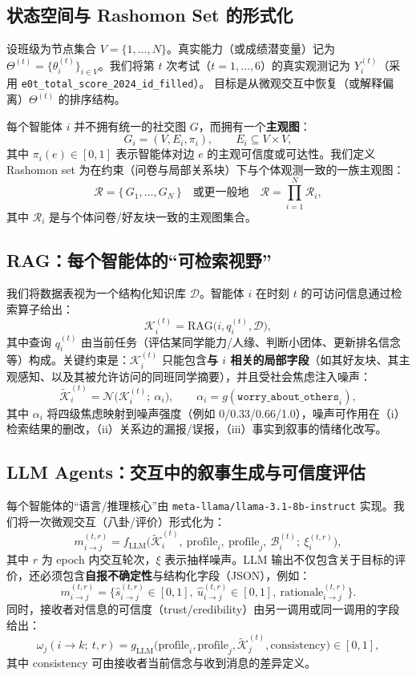 \documentclass[UTF8, a4paper, 11pt]{ctexart}
\begin{document}
\subsection{状态空间与 Rashomon Set 的形式化}
设班级为节点集合 \(V=\{1,\dots,N\}\)。真实能力（或成绩潜变量）记为 \(\Theta^{(t)}=\{\theta_i^{(t)}\}_{i\in V}\)。我们将第 \(t\) 次考试（\(t=1,\dots,6\)）的真实观测记为 \(Y_i^{(t)}\)（采用 \texttt{e0t\_total\_score\_2024\_id\_filled}）。
目标是从微观交互中恢复（或解释偏离）\(\Theta^{(t)}\) 的排序结构。

每个智能体 \(i\) 并不拥有统一的社交图 \(G\)，而拥有一个\textbf{主观图}：
\[
G_i = (V, E_i, \pi_i),\qquad E_i \subseteq V\times V,
\]
其中 \(\pi_i(e)\in[0,1]\) 表示智能体对边 \(e\) 的主观可信度或可达性。我们定义 Rashomon set 为在约束（问卷与局部关系块）下与个体观测一致的一族主观图：
\[
\mathcal{R} = \{\, G_1,\dots,G_N \,\}\quad\text{或更一般地}\quad
\mathcal{R}=\prod_{i=1}^N \mathcal{R}_i,
\]
其中 \(\mathcal{R}_i\) 是与个体问卷/好友块一致的主观图集合。

\subsection{RAG：每个智能体的“可检索视野”}
我们将数据表视为一个结构化知识库 \(\mathcal{D}\)。智能体 \(i\) 在时刻 \(t\) 的可访问信息通过检索算子给出：
\[
\mathcal{K}_i^{(t)} = \text{RAG}\big(i, q_i^{(t)}, \mathcal{D}\big),
\]
其中查询 \(q_i^{(t)}\) 由当前任务（评估某同学能力/人缘、判断小团体、更新排名信念等）构成。关键约束是：\(\mathcal{K}_i^{(t)}\) 只能包含\textbf{与 \(i\) 相关的局部字段}（如其好友块、其主观感知、以及其被允许访问的同班同学摘要），并且受社会焦虑注入噪声：
\[
\tilde{\mathcal{K}}_i^{(t)} = \mathcal{N}\big(\mathcal{K}_i^{(t)};\ \alpha_i\big),\qquad
\alpha_i = g(\texttt{worry\_about\_others}_i),
\]
其中 \(\alpha_i\) 将四级焦虑映射到噪声强度（例如 0/0.33/0.66/1.0），噪声可作用在（i）检索结果的删改，（ii）关系边的漏报/误报，（iii）事实到叙事的情绪化改写。

\subsection{LLM Agents：交互中的叙事生成与可信度评估}
每个智能体的“语言/推理核心”由 \texttt{meta-llama/llama-3.1-8b-instruct} 实现。我们将一次微观交互（八卦/评价）形式化为：
\[
m_{i\to j}^{(t,r)} = f_{\text{LLM}}\Big(\tilde{\mathcal{K}}_i^{(t)},\ \text{profile}_i,\ \text{profile}_j,\ \mathcal{B}_i^{(t)};\ \xi_i^{(t,r)}\Big),
\]
其中 \(r\) 为 epoch 内交互轮次，\(\xi\) 表示抽样噪声。LLM 输出不仅包含关于目标的评价，还必须包含\textbf{自报不确定性}与结构化字段（JSON），例如：
\[
m_{i\to j}^{(t,r)} = \{\hat{s}_{i\to j}^{(t,r)}\in[0,1],\ \hat{u}_{i\to j}^{(t,r)}\in[0,1],\ \text{rationale}_{i\to j}^{(t,r)}\}.
\]
同时，接收者对信息的可信度（trust/credibility）由另一调用或同一调用的字段给出：
\[
\omega_{j}(i\to k;\ t,r) = g_{\text{LLM}}\big(\text{profile}_i,\text{profile}_j,\tilde{\mathcal{K}}_j^{(t)},\text{consistency}\big)\in[0,1],
\]
其中 consistency 可由接收者当前信念与收到消息的差异定义。
\end{document}

